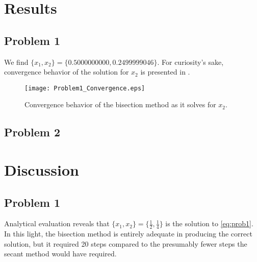 \documentclass[12pt]{article}
\begin{document}
\section{Results} %

\subsection{Problem 1}

We find $\{ x_1, x_2 \} = \{ 0.5000000000, 0.2499999046 \}$. For curiosity's sake, convergence behavior of the solution for $x_2$ is presented in .

\begin{figure}[h!]
\begin{center}
\texttt{[image: Problem1\_Convergence.eps]}
\\
\caption{Convergence behavior of the bisection method as it solves for $x_2$.}
\label{fig:prob1_convergence}
\end{center}
\end{figure}

\subsection{Problem 2}

\section{Discussion} %

\subsection{Problem 1}

Analytical evaluation reveals that $\{ x_1, x_2 \} = \{ \tfrac{1}{2}, \tfrac{1}{4} \}$ is the solution to \eqref{eq:prob1}. In this light, the bisection method is entirely adequate in producing the correct solution, but it required 20 steps compared to the presumably fewer steps the secant method would have required.
\end{document}
